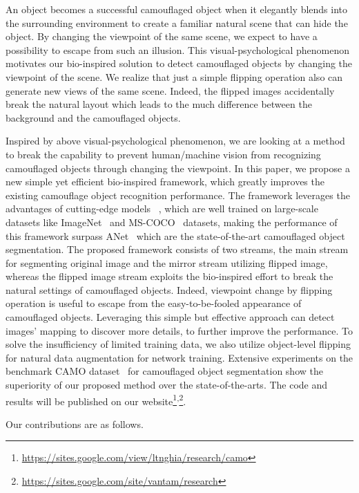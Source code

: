 \documentclass[journal]{IEEEtran}
\begin{document}
An object becomes a successful camouflaged object when it elegantly blends into the surrounding environment to create a familiar natural scene that can hide the object. By changing the viewpoint of the same scene, we expect to have a possibility to escape from such an illusion. This visual-psychological phenomenon motivates our bio-inspired solution to detect camouflaged objects by changing the viewpoint of the scene. We realize that just a simple flipping operation also can generate new views of the same scene. Indeed, the flipped images accidentally break the natural layout which leads to the much difference between the background and the camouflaged objects. 

Inspired by above visual-psychological phenomenon, we are looking at a method to break the capability to prevent human/machine vision from recognizing camouflaged objects through changing the viewpoint. In this paper, we propose a new simple yet efficient bio-inspired framework, which greatly improves the existing camouflage object recognition performance. The framework leverages the advantages of cutting-edge models~\cite{He-CVPR2016,resnext} , which are well trained on large-scale datasets like ImageNet~\cite{Russakovsky-IJCV2015} and MS-COCO~\cite{Lin-ECCV2014} datasets, making the performance of this framework surpass ANet~\cite{CAMO} which are the state-of-the-art camouflaged object segmentation. The proposed framework consists of two streams, the main stream for segmenting original image and the mirror stream utilizing flipped image, whereas the flipped image stream exploits the bio-inspired effort to break the natural settings of camouflaged objects. Indeed, viewpoint change by flipping operation is useful to escape from the easy-to-be-fooled appearance of camouflaged objects. Leveraging this simple but effective approach can detect images’ mapping to discover more details, to further improve the performance. To solve the insufficiency of limited training data, we also utilize object-level flipping for natural data augmentation for network training. Extensive experiments on the benchmark CAMO dataset~\cite{CAMO} for camouflaged object segmentation show the superiority of our proposed method over the state-of-the-arts. The code and results will be published on our website\footnote{\url{https://sites.google.com/view/ltnghia/research/camo}}\textsuperscript{,}\footnote{\url{https://sites.google.com/site/vantam/research}}.





Our contributions are as follows. 
\end{document}
